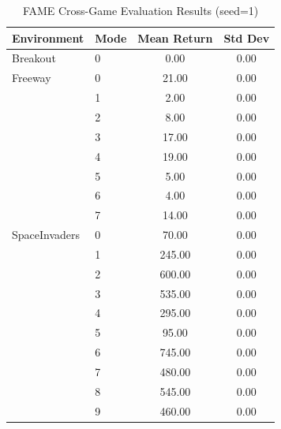 \begin{table}[h]
\centering
\caption{FAME Cross-Game Evaluation Results (seed=1)}
\label{tab:fame-cross-game}
\begin{tabular}{llcc}
\toprule
Environment & Mode & Mean Return & Std Dev \\
\midrule
Breakout & 0 & 0.00 & 0.00 \\
\midrule
Freeway & 0 & 21.00 & 0.00 \\
 & 1 & 2.00 & 0.00 \\
 & 2 & 8.00 & 0.00 \\
 & 3 & 17.00 & 0.00 \\
 & 4 & 19.00 & 0.00 \\
 & 5 & 5.00 & 0.00 \\
 & 6 & 4.00 & 0.00 \\
 & 7 & 14.00 & 0.00 \\
\midrule
SpaceInvaders & 0 & 70.00 & 0.00 \\
 & 1 & 245.00 & 0.00 \\
 & 2 & 600.00 & 0.00 \\
 & 3 & 535.00 & 0.00 \\
 & 4 & 295.00 & 0.00 \\
 & 5 & 95.00 & 0.00 \\
 & 6 & 745.00 & 0.00 \\
 & 7 & 480.00 & 0.00 \\
 & 8 & 545.00 & 0.00 \\
 & 9 & 460.00 & 0.00 \\
\bottomrule
\end{tabular}
\end{table}